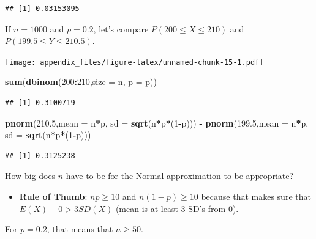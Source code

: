 \documentclass[
]{book}
\newenvironment{Shaded}{\begin{snugshade}}{\end{snugshade}}
\newcommand{\DataTypeTok}[1]{\textcolor[rgb]{0.13,0.29,0.53}{#1}}
\newcommand{\DecValTok}[1]{\textcolor[rgb]{0.00,0.00,0.81}{#1}}
\newcommand{\FloatTok}[1]{\textcolor[rgb]{0.00,0.00,0.81}{#1}}
\newcommand{\KeywordTok}[1]{\textcolor[rgb]{0.13,0.29,0.53}{\textbf{#1}}}
\newcommand{\NormalTok}[1]{#1}
\newcommand{\OperatorTok}[1]{\textcolor[rgb]{0.81,0.36,0.00}{\textbf{#1}}}
\newcommand{\StringTok}[1]{\textcolor[rgb]{0.31,0.60,0.02}{#1}}
\providecommand{\tightlist}{%
  \setlength{\itemsep}{0pt}\setlength{\parskip}{0pt}}
\begin{document}
\begin{verbatim}
## [1] 0.03153095
\end{verbatim}

If \(n=1000\) and \(p=0.2\), let's compare \(P(200\leq X\leq 210)\) and \(P(199.5\leq Y\leq 210.5)\).

\texttt{[image: appendix\_files/figure-latex/unnamed-chunk-15-1.pdf]}

\begin{Shaded}
\begin{Highlighting}[]
\KeywordTok{sum}\NormalTok{(}\KeywordTok{dbinom}\NormalTok{(}\DecValTok{200}\OperatorTok{:}\DecValTok{210}\NormalTok{,}\DataTypeTok{size =}\NormalTok{ n, }\DataTypeTok{p =}\NormalTok{ p))}
\end{Highlighting}
\end{Shaded}

\begin{verbatim}
## [1] 0.3100719
\end{verbatim}

\begin{Shaded}
\begin{Highlighting}[]
\KeywordTok{pnorm}\NormalTok{(}\FloatTok{210.5}\NormalTok{,}\DataTypeTok{mean =}\NormalTok{ n}\OperatorTok{*}\NormalTok{p, }\DataTypeTok{sd =} \KeywordTok{sqrt}\NormalTok{(n}\OperatorTok{*}\NormalTok{p}\OperatorTok{*}\NormalTok{(}\DecValTok{1}\OperatorTok{-}\NormalTok{p))) }\OperatorTok{-}\StringTok{ }\KeywordTok{pnorm}\NormalTok{(}\FloatTok{199.5}\NormalTok{,}\DataTypeTok{mean =}\NormalTok{ n}\OperatorTok{*}\NormalTok{p, }\DataTypeTok{sd =} \KeywordTok{sqrt}\NormalTok{(n}\OperatorTok{*}\NormalTok{p}\OperatorTok{*}\NormalTok{(}\DecValTok{1}\OperatorTok{-}\NormalTok{p)))}
\end{Highlighting}
\end{Shaded}

\begin{verbatim}
## [1] 0.3125238
\end{verbatim}

How big does \(n\) have to be for the Normal approximation to be appropriate?

\begin{itemize}
\tightlist
\item
  \textbf{Rule of Thumb}: \(np \geq 10\) and \(n(1-p)\geq 10\) because that makes sure that \(E(X)-0>3SD(X)\) (mean is at least 3 SD's from 0).
\end{itemize}

For \(p=0.2\), that means that \(n\geq 50\).
\end{document}
